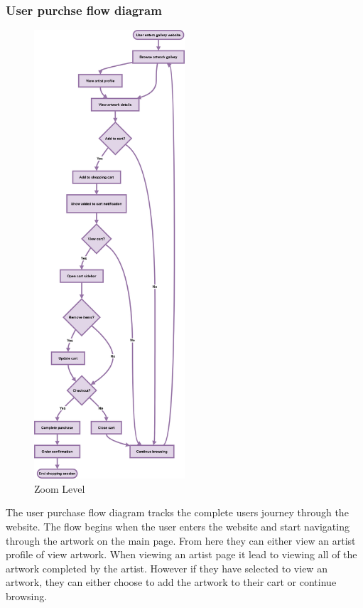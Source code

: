 \documentclass[]{project_final}
\begin{document}
\subsubsection{User purchse flow diagram}

\begin{figure}[ht!]
    \centering
    \includegraphics[width=0.5\textwidth]{AGUserPurchaseFlow.png}
    \vspace*{0.0cm}
    \caption{Zoom Level}
    \label{fig:1}
\end{figure}

The user purchase flow diagram tracks the complete users journey through the website. The flow begins when the user enters the website and start navigating through the artwork on the main page. From here they can either view an artist profile of view artwork. When viewing an artist page it lead to viewing all of the artwork completed by the artist. However if they have selected to view an artwork, they can either choose to add the artwork to their cart or continue browsing.
\end{document}
